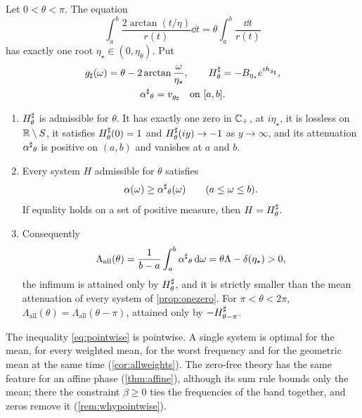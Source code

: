 \begin{theorem}\label{thm:allzeros}
Let $0<\theta<\pi$. The equation
\begin{equation}\label{eq:etastar}
\int_a^b\frac{2\arctan(t/\eta)}{r(t)}\dd t=\theta\int_a^b\frac{\dd t}{r(t)}
\end{equation}
has exactly one root $\eta_\star\in(0,\eta_\theta)$. Put
\begin{gather*}
g_\sharp(\omega)=\theta-2\arctan\frac\omega{\eta_\star},\qquad
H^{\sharp}_\theta=-B_{\eta_\star}e^{ih_{g_\sharp}},\\
{\alpha^{\sharp}}_\theta=v_{g_\sharp}\quad\text{on }[a,b].
\end{gather*}
\begin{enumerate}
\item[(i)] $H^{\sharp}_\theta$ is admissible for $\theta$. It has exactly one zero in
$\mathbb C_{+}$, at $i\eta_\star$, it is lossless on $\mathbb R\setminus S$, it satisfies
$H^{\sharp}_\theta(0)=1$ and $H^{\sharp}_\theta(iy)\to-1$ as $y\to\infty$, and its
attenuation ${\alpha^{\sharp}}_\theta$ is positive on $(a,b)$ and vanishes at $a$ and $b$.
\item[(ii)] Every system $H$ admissible for $\theta$ satisfies
\begin{equation}\label{eq:pointwise}
\alpha(\omega)\ge{\alpha^{\sharp}}_\theta(\omega)\qquad(a\le\omega\le b).
\end{equation}
If equality holds on a set of positive measure, then $H=H^{\sharp}_\theta$.
\item[(iii)] Consequently
\begin{equation}\label{eq:lambdaall}
\Lambda_{\mathrm{all}}(\theta)=\frac1{b-a}\int_a^b{\alpha^{\sharp}}_\theta\,\mathrm d\omega
=\theta\Lambda-\delta(\eta_\star)>0,
\end{equation}
the infimum is attained only by $H^{\sharp}_\theta$, and it is strictly smaller than
the mean attenuation of every system of \cref{prop:onezero}. For
$\pi<\theta<2\pi$, $\Lambda_{\mathrm{all}}(\theta)=\Lambda_{\mathrm{all}}(\theta-\pi)$,
attained only by $-H^{\sharp}_{\theta-\pi}$.
\end{enumerate}
\end{theorem}

The inequality \eqref{eq:pointwise} is pointwise. A single system is
optimal for the mean, for every weighted mean, for the worst frequency and
for the geometric mean at the same time (\cref{cor:allweights}). The
zero-free theory has the same feature for an affine phase
(\cref{thm:affine}), although its sum rule bounds only the mean; there the
constraint $\beta\ge0$ ties the frequencies of the band together, and
zeros remove it (\cref{rem:whypointwise}).

